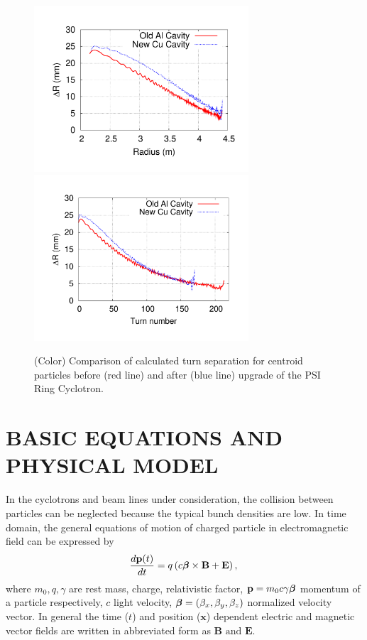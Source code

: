\documentclass[aps,prstab,twocolumn,superscriptaddress,showpacs]{revtex4}
\newcommand{\bs}[1]{\mathbf #1}
\begin{document}
    
  \begin{figure}
    {\includegraphics[width=8cm,trim=2.5cm 2.5cm 2.5cm 2.5cm]{figures/R_dR_Ring.pdf}}
    {\includegraphics[width=8cm,trim=2.5cm 2.5cm 2.5cm 2.5cm]{figures/Turn_dR_Ring.pdf}}
    \caption{(Color) Comparison of calculated turn separation for centroid particles before (red line) and after (blue line) upgrade of the PSI Ring Cyclotron.}
    \label{fig:TuneSep}
  \end{figure}

\section{BASIC EQUATIONS AND PHYSICAL MODEL }

In the cyclotrons and beam lines under consideration, the collision between particles can be neglected because the   typical bunch densities are low.
In time domain, the general equations of motion of charged particle in electromagnetic field can be expressed by
\begin{equation}\label{eq:motion}
  \frac{d\bs{p}(t)}{dt}  = q\left(c\mbox{\boldmath$\beta$}\times \bs{B} + \bs{E}\right), \nonumber \\
\end{equation}
where $m_0, q,\gamma$ are rest mass, charge, relativistic factor, $\bs{p}=m_0 c \gamma \mbox{\boldmath$\beta$}$ momentum of a particle respectively, 
$c$ light velocity, $\mbox{\boldmath$\beta$}=(\beta_x, \beta_y, \beta_z)$ normalized velocity vector. In general the time ($t$) and position ($\bs{x}$) dependent electric and magnetic vector fields are
written in abbreviated form as $\bs{B} \text{ and } \bs{E}$.
\end{document}
